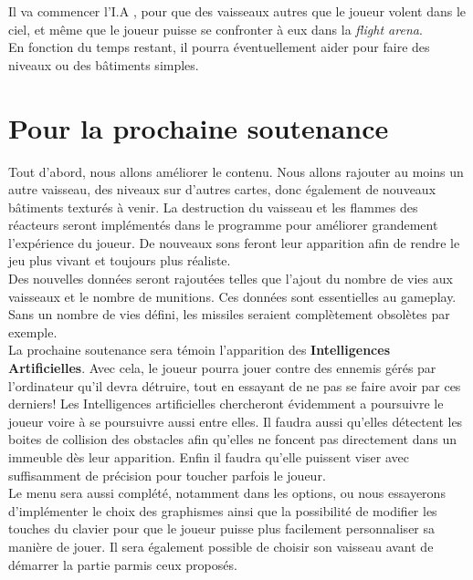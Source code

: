\documentclass[10pt, titlepage]{report}
\begin{document}
Il va commencer l'I.A , pour que des vaisseaux autres que le joueur volent dans le ciel, et même que le joueur puisse se confronter à eux dans la \textit{flight arena}.\\

En fonction du temps restant, il pourra éventuellement aider pour faire des niveaux ou des bâtiments simples.

\chapter{Pour la prochaine soutenance}

Tout d'abord, nous allons améliorer le contenu. Nous allons rajouter au moins un autre vaisseau, des niveaux sur d'autres cartes, donc également de nouveaux bâtiments texturés à venir. La destruction du vaisseau et les flammes des réacteurs seront implémentés dans le programme pour améliorer grandement l'expérience du joueur. De nouveaux sons feront leur apparition afin de rendre le jeu plus vivant et toujours plus réaliste.\\

Des nouvelles données seront rajoutées telles que l'ajout du nombre de vies aux vaisseaux et le nombre de munitions. Ces données sont essentielles au gameplay. Sans un nombre de vies défini, les missiles seraient complètement obsolètes par exemple.\\

La prochaine soutenance sera témoin l'apparition des \textbf{Intelligences Artificielles}. Avec cela, le joueur pourra jouer contre des ennemis gérés par l'ordinateur qu'il devra détruire, tout en essayant de ne pas se faire avoir par ces derniers! Les Intelligences artificielles chercheront évidemment a poursuivre le joueur voire à se poursuivre aussi entre elles. Il faudra aussi qu'elles détectent les boites de collision des obstacles afin qu'elles ne foncent pas directement dans un immeuble dès leur apparition. Enfin il faudra qu'elle puissent viser avec suffisamment de précision pour toucher parfois le joueur. \\

Le menu sera aussi complété, notamment dans les options, ou nous essayerons d'implémenter le choix des graphismes ainsi que la possibilité de modifier les touches du clavier pour que le joueur puisse plus facilement personnaliser sa manière de jouer. Il sera également possible de choisir son vaisseau avant de démarrer la partie parmis ceux proposés.\\
\end{document}
